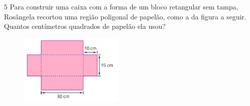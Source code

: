 {{{{\begin{escolha}[itemsep=0pt]
\end{escolha}

\num{5} Para construir uma caixa com a forma de um bloco retangular sem
tampa, Rosângela recortou uma região poligonal de papelão, como a da
figura a seguir. Quantos centímetros quadrados de papelão ela usou?

\begin{figure}[H]
\centering\includegraphics[width=1.98333in,height=1.33255in]{./imgSAEB_8_MAT/media/image45.png}
\end{figure}











}}}}

